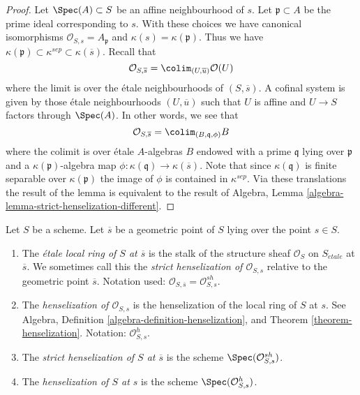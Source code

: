 \begin{proof}
Let $\Spec(A) \subset S$ be an affine neighbourhood of $s$.
Let $\mathfrak p \subset A$ be the prime ideal corresponding to $s$.
With these choices we have canonical isomorphisms
$\mathcal{O}_{S, s} = A_{\mathfrak p}$ and $\kappa(s) = \kappa(\mathfrak p)$.
Thus we have
$\kappa(\mathfrak p) \subset \kappa^{sep} \subset \kappa(\overline{s})$.
Recall that
$$
\mathcal{O}_{S, \overline{s}} =
\colim_{(U, \overline{u})} \mathcal{O}(U)
$$
where the limit is over the \'etale neighbourhoods of $(S, \overline{s})$.
A cofinal system is given by those \'etale neighbourhoods $(U, \overline{u})$
such that $U$ is affine and $U \to S$ factors through $\Spec(A)$.
In other words, we see that
$$
\mathcal{O}_{S, \overline{s}} = \colim_{(B, \mathfrak q, \phi)} B
$$
where the colimit is over \'etale $A$-algebras $B$ endowed with a prime
$\mathfrak q$ lying over $\mathfrak p$ and a
$\kappa(\mathfrak p)$-algebra map
$\phi : \kappa(\mathfrak q) \to \kappa(\overline{s})$.
Note that since $\kappa(\mathfrak q)$ is finite separable over
$\kappa(\mathfrak p)$ the image of $\phi$ is contained in $\kappa^{sep}$.
Via these translations the result of the lemma is equivalent
to the result of
Algebra, Lemma \ref{algebra-lemma-strict-henselization-different}.
\end{proof}

\begin{definition}
\label{definition-etale-local-rings}
Let $S$ be a scheme. Let $\overline{s}$ be a geometric point of $S$
lying over the point $s \in S$.
\begin{enumerate}
\item The {\it \'etale local ring of $S$ at $\overline{s}$}
is the stalk of the structure sheaf $\mathcal{O}_S$ on $S_{\acute{e}tale}$
at $\overline{s}$. We sometimes call this the
{\it strict henselization of $\mathcal{O}_{S, s}$} relative
to the geometric point $\overline{s}$.
Notation used:
$\mathcal{O}_{S, \overline{s}} = \mathcal{O}_{S, s}^{sh}$.
\item The {\it henselization of $\mathcal{O}_{S, s}$} is the
henselization of the local ring of $S$ at $s$. See
Algebra, Definition \ref{algebra-definition-henselization},
and
Theorem \ref{theorem-henselization}.
Notation: $\mathcal{O}_{S, s}^h$.
\item The {\it strict henselization of $S$ at $\overline{s}$}
is the scheme $\Spec(\mathcal{O}_{S, s}^{sh})$.
\item The {\it henselization of $S$ at $s$} is the scheme
$\Spec(\mathcal{O}_{S, s}^h)$.
\end{enumerate}
\end{definition}

